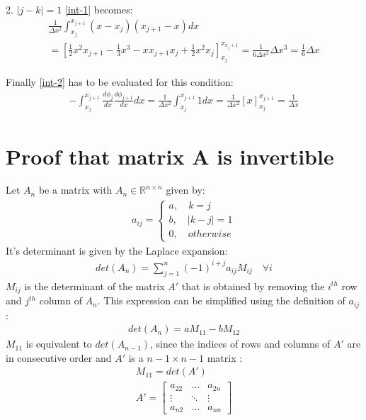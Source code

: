 2. \(|j - k| = 1\)
\ref{int-1} becomes:
\begin{gather}
\frac{1}{\Delta x^2} \int_{x_j}^{x_{j+1}} (x-x_j)(x_{j+1} - x)dx \\
= \left[ \frac{1}{2} x^2 x_{j+1} - \frac{1}{3} x^3 - x x_{j+1} x_{j} + \frac{1}{2} x^2 x_j \right]_{x_j}^{x_{x_j+1}} 
= \frac{1}{6 \Delta x^2} \Delta x^3 = \frac{1}{6} \Delta x
\end{gather}
 
Finally \ref{int-2} has to be evaluated for this condition:
\begin{gather}
-\int_{x_j}^{x_{j+1}} \frac{d\phi_{j}}{dx}\frac{d\phi_{j+1}}{dx}dx = \frac{1}{\Delta x^2} \int_{x_j}^{x_{j+1}} 1 dx =  \frac{1}{\Delta x^2} \left[ x \right]_{x_{j}}^{x_{j+1}} = \frac{1}{\Delta x}
\end{gather}
\newpage
\section{Proof that matrix A is invertible}
\label{ap-A-inv}
Let \(A_{n}\) be a matrix with \(A_{n} \in \mathbb{R}^{n \times n}\) given by:
\begin{gather}
a_{ij} = \begin{cases}
a, \quad k = j \\
b, \quad |k - j| = 1 \\
0, \quad otherwise 
\end{cases}
\end{gather}
It's determinant is given by the Laplace expansion:
\begin{gather}
det(A_n) = \sum_{j=1}^{n} (-1)^{i+j} a_{ij} M_{ij} \quad \forall i
\end{gather}
\(M_{ij}\) is the determinant of the matrix \(A'\) that is obtained by removing the \(i^{th}\) row and \(j^{th}\) column of \(A_n\).
This expression can be simplified using the definition of \(a_{ij}\):
\begin{gather}
det(A_n) = a M_{11} - b M_{12} \label{1}
\end{gather}
\(M_{11}\) is equivalent to \(det(A_{n-1})\), since the indices of rows and columns of \(A'\) are in consecutive order and \(A'\) is a \(n-1 \times n-1\) matrix :
\begin{gather}
M_{11} = det(A') \\
A' = \begin{bmatrix}
a_{22} & \dots & a_{2n}\\
\vdots & \ddots & \vdots \\
a_{n2} & \dots & a_{nn}
\end{bmatrix}
\end{gather}
